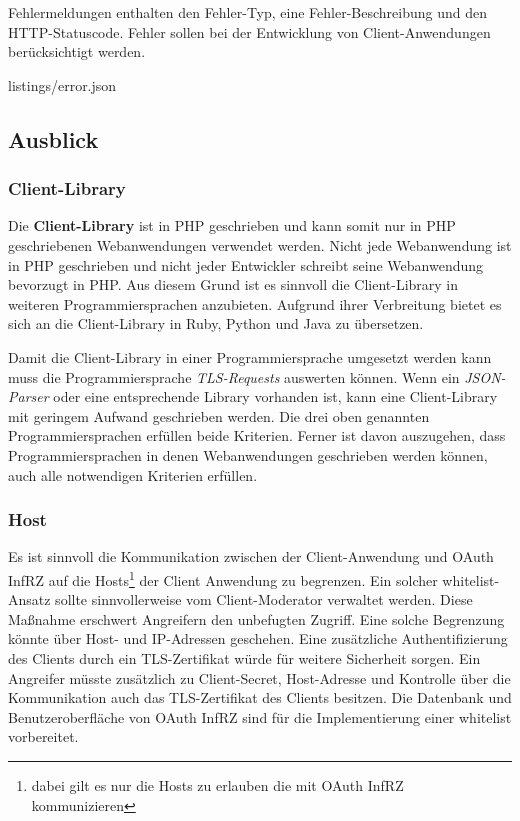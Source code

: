 \documentclass[12pt,a4paper,pointednumbers,abstracton]{scrartcl}
\begin{document}
Fehlermeldungen enthalten den Fehler-Typ, eine Fehler-Beschreibung und den HTTP-Statuscode.
Fehler sollen bei der Entwicklung von Client-Anwendungen berücksichtigt werden.

\begin{minipage}{\textwidth}
	
	{listings/error.json}
\end{minipage}

\subsection{Ausblick}

\subsubsection{Client-Library}

Die \textbf{Client-Library} ist in PHP geschrieben und kann somit nur in PHP geschriebenen Webanwendungen verwendet werden.
Nicht jede Webanwendung ist in PHP geschrieben und nicht jeder Entwickler schreibt seine Webanwendung bevorzugt in PHP.
Aus diesem Grund ist es sinnvoll die Client-Library in weiteren Programmiersprachen anzubieten.
Aufgrund ihrer Verbreitung bietet es sich an die Client-Library in Ruby, Python und Java zu übersetzen.

Damit die Client-Library in einer Programmiersprache umgesetzt werden kann muss die Programmiersprache \emph{TLS-Requests} auswerten können.
Wenn ein \emph{JSON-Parser} oder eine entsprechende Library vorhanden ist, kann eine Client-Library mit geringem Aufwand geschrieben werden.
Die drei oben genannten Programmiersprachen erfüllen beide Kriterien.
Ferner ist davon auszugehen, dass Programmiersprachen in denen Webanwendungen geschrieben werden können, auch alle notwendigen Kriterien erfüllen. 

\subsubsection{Host}
\label{sec:oauth-infrz/host}

Es ist sinnvoll die Kommunikation zwischen der Client-Anwendung und OAuth InfRZ auf die Hosts\footnote{dabei gilt es nur die Hosts zu erlauben die mit OAuth InfRZ kommunizieren} der Client Anwendung zu begrenzen.
Ein solcher whitelist-Ansatz sollte sinnvollerweise vom Client-Moderator verwaltet werden.
Diese Maßnahme erschwert Angreifern den unbefugten Zugriff.
Eine solche Begrenzung könnte über Host- und IP-Adressen geschehen.
Eine zusätzliche Authentifizierung des Clients durch ein TLS-Zertifikat würde für weitere Sicherheit sorgen.
Ein Angreifer müsste zusätzlich zu Client-Secret, Host-Adresse und Kontrolle über die Kommunikation auch das TLS-Zertifikat des Clients besitzen.
Die Datenbank und Benutzeroberfläche von OAuth InfRZ sind für die Implementierung einer whitelist vorbereitet.
\end{document}
